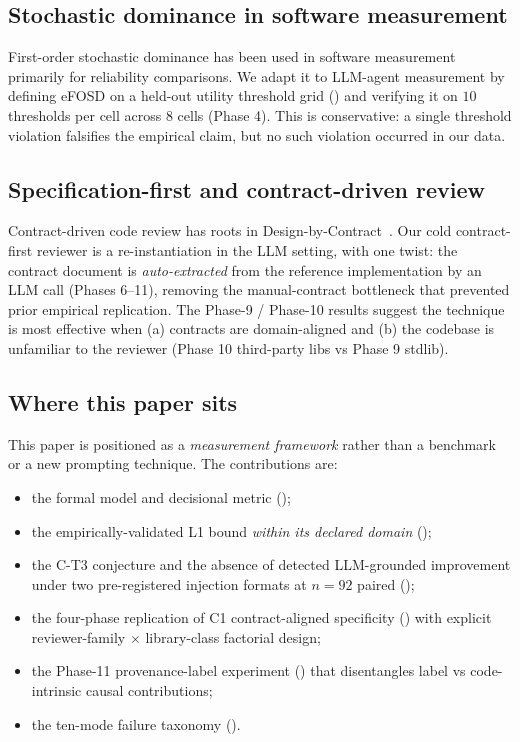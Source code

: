 \subsection{Stochastic dominance in software measurement}

First-order stochastic dominance has been used in software measurement primarily for reliability comparisons. We adapt it to LLM-agent measurement by defining eFOSD on a held-out utility threshold grid () and verifying it on $10$ thresholds per cell across $8$ cells (Phase 4). This is conservative: a single threshold violation falsifies the empirical claim, but no such violation occurred in our data.

\subsection{Specification-first and contract-driven review}

Contract-driven code review has roots in Design-by-Contract~\cite{meyer1997oosc}. Our cold contract-first reviewer is a re-instantiation in the LLM setting, with one twist: the contract document is \emph{auto-extracted} from the reference implementation by an LLM call (Phases 6--11), removing the manual-contract bottleneck that prevented prior empirical replication. The Phase-9 / Phase-10 results suggest the technique is most effective when (a) contracts are domain-aligned and (b) the codebase is unfamiliar to the reviewer (Phase 10 third-party libs vs Phase 9 stdlib).

\subsection{Where this paper sits}

This paper is positioned as a \emph{measurement framework} rather than a benchmark or a new prompting technique. The contributions are:
\begin{itemize}
\item the formal model and decisional metric ();
\item the empirically-validated L1 bound \emph{within its declared domain} ();
\item the C-T3 conjecture and the absence of detected LLM-grounded improvement under two pre-registered injection formats at $n = 92$ paired ();
\item the four-phase replication of C1 contract-aligned specificity () with explicit reviewer-family $\times$ library-class factorial design;
\item the Phase-11 provenance-label experiment () that disentangles label vs code-intrinsic causal contributions;
\item the ten-mode failure taxonomy ().
\end{itemize}
